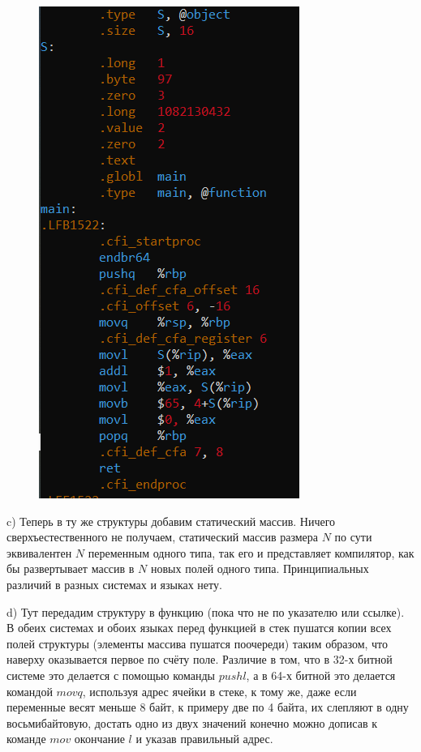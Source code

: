 \documentclass[a4paper,12pt]{article}
\begin{document}
\begin{figure}[H]
{\begin{minipage}[t]{0.4\textwidth}
        \includegraphics[scale = 0.6]{3бCpp64.png}
    \end{minipage}}
\end{figure}

c) Теперь в ту же структуры добавим статический массив. Ничего сверхъестественного не получаем, статический массив размера $N$ по сути эквивалентен $N$ переменным одного типа, так его и представляет компилятор, как бы развертывает массив в $N$ новых полей одного типа. Принципиальных различий в разных системах и языках нету.

d) Тут передадим структуру в функцию (пока что не по указателю или ссылке). В обеих системах и обоих языках перед функцией в стек пушатся копии всех полей структуры (элементы массива пушатся поочереди) таким образом, что наверху оказывается первое по счёту поле. Различие в том, что в 32-х битной системе это делается с помощью команды $pushl$, а в 64-х битной это делается командой $movq$, используя адрес ячейки в стеке, к тому же, даже если переменные весят меньше 8 байт, к примеру две по 4 байта, их слепляют в одну восьмибайтовую, достать одно из двух значений конечно можно дописав к команде $mov$ окончание $l$ и указав правильный адрес.
\end{document}
